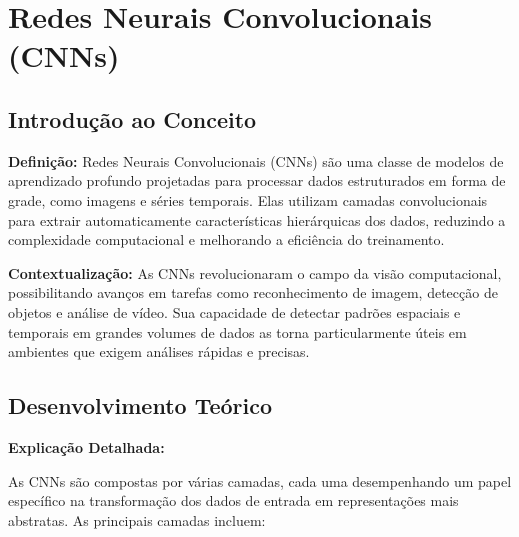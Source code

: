 \section{Redes Neurais Convolucionais (CNNs)}

\subsection{Introdução ao Conceito}

\textbf{Definição:}  
Redes Neurais Convolucionais (CNNs) são uma classe de modelos de aprendizado profundo projetadas para processar dados estruturados em forma de grade, como imagens e séries temporais. Elas utilizam camadas convolucionais para extrair automaticamente características hierárquicas dos dados, reduzindo a complexidade computacional e melhorando a eficiência do treinamento.

\textbf{Contextualização:}  
As CNNs revolucionaram o campo da visão computacional, possibilitando avanços em tarefas como reconhecimento de imagem, detecção de objetos e análise de vídeo. Sua capacidade de detectar padrões espaciais e temporais em grandes volumes de dados as torna particularmente úteis em ambientes que exigem análises rápidas e precisas.

\subsection{Desenvolvimento Teórico}

\textbf{Explicação Detalhada:}

As CNNs são compostas por várias camadas, cada uma desempenhando um papel específico na transformação dos dados de entrada em representações mais abstratas. As principais camadas incluem:

